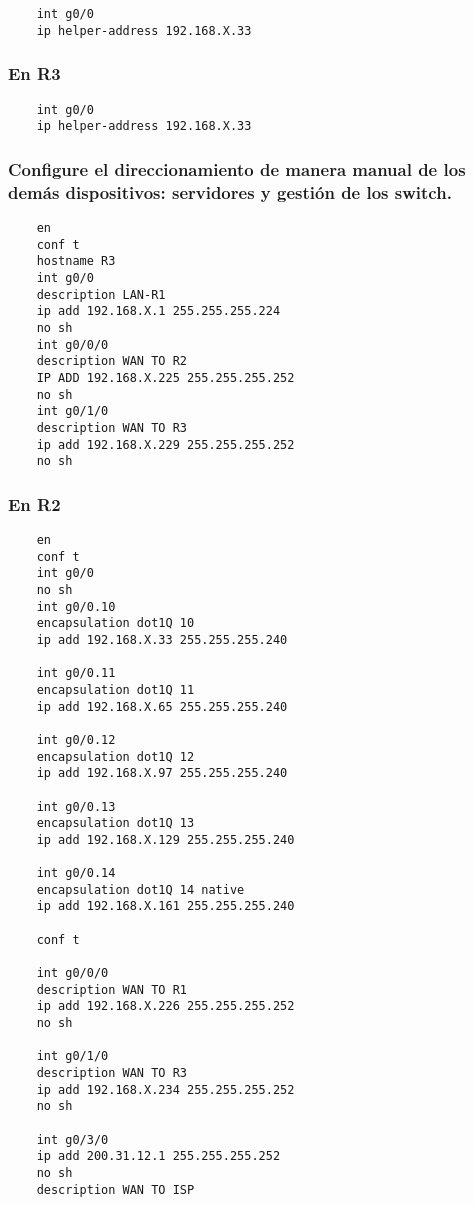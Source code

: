 \documentclass[twocolumn]{article}
\begin{document}
    \begin{verbatim}
    int g0/0
    ip helper-address 192.168.X.33
    \end{verbatim}
    
    \subsubsection*{En R3}
    
    \begin{verbatim}
    int g0/0
    ip helper-address 192.168.X.33
    \end{verbatim}
    
    \subsubsection*{Configure el direccionamiento de manera manual de los demás dispositivos: servidores y gestión de los switch.}
    
    \begin{verbatim}
    en
    conf t
    hostname R3
    int g0/0
    description LAN-R1
    ip add 192.168.X.1 255.255.255.224
    no sh
    int g0/0/0
    description WAN TO R2
    IP ADD 192.168.X.225 255.255.255.252
    no sh
    int g0/1/0
    description WAN TO R3
    ip add 192.168.X.229 255.255.255.252
    no sh
    \end{verbatim}
    
    \subsubsection*{En R2}
    
    \begin{verbatim}
    en
    conf t
    int g0/0
    no sh
    int g0/0.10
    encapsulation dot1Q 10
    ip add 192.168.X.33 255.255.255.240
    
    int g0/0.11
    encapsulation dot1Q 11
    ip add 192.168.X.65 255.255.255.240
    
    int g0/0.12
    encapsulation dot1Q 12
    ip add 192.168.X.97 255.255.255.240
    
    int g0/0.13
    encapsulation dot1Q 13
    ip add 192.168.X.129 255.255.255.240
    
    int g0/0.14
    encapsulation dot1Q 14 native
    ip add 192.168.X.161 255.255.255.240
    
    conf t
    
    int g0/0/0
    description WAN TO R1
    ip add 192.168.X.226 255.255.255.252
    no sh
    
    int g0/1/0
    description WAN TO R3
    ip add 192.168.X.234 255.255.255.252
    no sh
    
    int g0/3/0
    ip add 200.31.12.1 255.255.255.252
    no sh
    description WAN TO ISP
    \end{verbatim}
    
\end{document}
